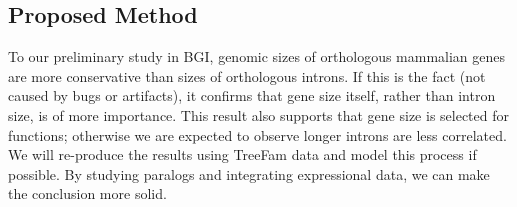 \subsection{Proposed Method}
To our preliminary study in BGI, genomic sizes of orthologous mammalian genes are more conservative than sizes
of orthologous introns. If this is the fact (not caused by bugs or artifacts), it confirms that gene size itself, rather than
intron size, is of more importance. This result also supports that gene size is selected for
functions; otherwise we are expected to observe longer introns are less correlated.
We will re-produce the results using TreeFam data and model this process if possible.
By studying paralogs and integrating expressional data, we can make the conclusion more solid.



